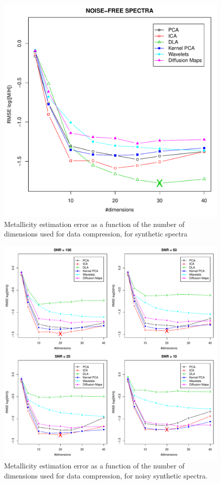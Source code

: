 \documentclass[a4paper,fleqn,usenatbib]{mnras}
\begin{document}
{{{\begin{figure}
\centering\includegraphics[width=\columnwidth]{flamesHR10_SNR=000_Meta_log_BestSVM_N-RMSE_test.pdf}
\caption{Metallicity estimation error as a function of the number of
  dimensions used for data compression, for synthetic spectra}
\label{fig:05}
\end{figure}

\begin{figure}
\centering\includegraphics[width=\textwidth]{flamesHR10_Meta_log_BestSVM_N-RMSE_test.pdf}
\caption{Metallicity estimation error as a function of the number of
  dimensions used for data compression, for noisy synthetic
  spectra.}
\label{fig:06}
\end{figure}

}}}
\end{document}
